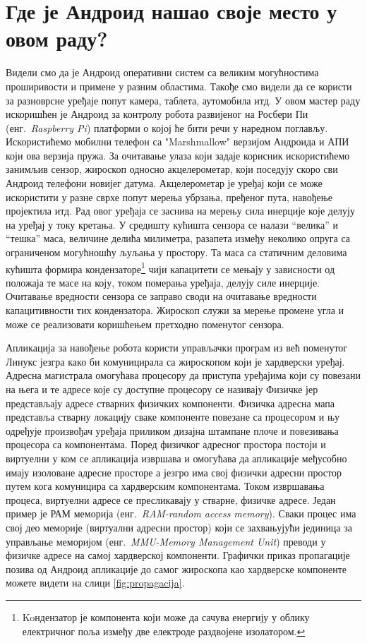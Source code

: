 \documentclass[12pt,oneside]{memoir}
\theoremstyle{remark}
\begin{document}
\section{Где је Андроид нашао своје место у овом раду?}
Видели смо да је Андроид оперативни систем са великим могућностима проширивости и примене у разним областима. Такође смо видели да се користи за разноврсне уређаје попут камера, таблета, аутомобила итд. У овом мастер раду искоришћен је Андроид за контролу робота развијеног на Росбери Пи  (енг.~{\em Raspberry Pi}) платформи о којој ће бити речи у наредном поглављу. 
Искористићемо мобилни телефон са "Marshmallow" верзијом Андроида и АПИ који ова верзија пружа. За очитавање улаза који задаје корисник искористићемо занимљив сензор,  жироскоп односно акцелерометар, који поседују скоро сви Андроид телефони новијег датума. Акцелерометар је уређај који се може искористити у разне сврхе попут мерења убрзања, пређеног пута, навођење пројектила итд. Рад овог уређаја се заснива на мерењу сила инерције које делују на уређај у току кретања. У средишту кућишта сензора се налази \enquote{велика} и \enquote{тешка} маса, величине делића милиметра, разапета између неколико опруга са ограниченом могућношћу љуљања у простору. Та маса са статичним деловима кућишта формира кондензаторе\footnote{Koндензатор је компонента који може да сачува енергију у облику електричног поља између две електроде раздвојене изолатором.} чији капацитети се мењају у зависности од положаја те масе на коју, током померања уређаја, делују силе инерције. Очитавање вредности сензора се заправо своди на очитавање вредности капацитивности тих кондензатора. Жироскоп служи за мерење промене угла и може се реализовати коришћењем претходно поменутог сензора.

Апликација за навођење робота користи управљачки програм из већ поменутог Линукс језгра како би комуницирала са жироскопом који је хардверски уређај. Адресна магистрала омогућава процесору да приступа уређајима који су повезани на њега и те адресе које су доступне процесору се називају Физичке јер представљају адресе стварних физичких компоненти. Физичка адресна мапа представља  стварну локацију сваке компоненте повезане са процесором и њу одређује произвођач уређаја приликом дизајна штампане плоче и повезивања процесора са компонентама. Поред физичког адресног простора постоји и виртуелни у ком се апликација извршава и омогућава да апликације међусобно имају изоловане адресне просторе а језгро има свој физички адресни простор путем кога комуницира са хардверским компонентама. Током извршавања процеса, виртуелни адресе се пресликавају у стварне, физичке адресе. Један пример је РАМ меморија (енг.~{\em RAM-random access memory}). Сваки процес има свој део меморије (виртуални адресни простор) који се захвањујући јединица за управљање меморијом (енг.~{\em MMU-Memory Management Unit}) преводи у физичке адресе на самој хардверској компоненти. Графички приказ пропагације позива од Андроид апликације до самог жироскопа као хардверске компоненте можете видети на слици \ref{fig:propagacija}.
\end{document}
